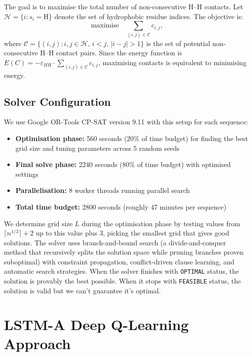 \documentclass[12pt, oneside, openany]{book}
\theoremstyle{plain}
\theoremstyle{definition}
\begin{document}
The goal is to maximise the total number of non-consecutive H--H contacts. Let $\mathcal{H} = \{i : s_i = \text{H}\}$ denote the set of hydrophobic residue indices. The objective is:
\begin{equation}
\text{maximise} \quad \sum_{(i,j) \in \mathcal{C}} c_{i,j},
\end{equation}
where $\mathcal{C} = \{(i,j) : i,j \in \mathcal{H}, \, i < j, \, |i - j| > 1\}$ is the set of potential non-consecutive H--H contact pairs. Since the energy function is $E(C) = -\varepsilon_{HH} \cdot \sum_{(i,j) \in \mathcal{C}} c_{i,j}$, maximising contacts is equivalent to minimising energy.

\subsection{Solver Configuration}

We use Google OR-Tools CP-SAT version 9.11 with this setup for each sequence:
\begin{itemize}
\item \textbf{Optimisation phase:} 560 seconds (20\% of time budget) for finding the best grid size and tuning parameters across 5 random seeds
\item \textbf{Final solve phase:} 2240 seconds (80\% of time budget) with optimised settings
\item \textbf{Parallelisation:} 8 worker threads running parallel search
\item \textbf{Total time budget:} 2800 seconds (roughly 47 minutes per sequence)
\end{itemize}
We determine grid size $L$ during the optimisation phase by testing values from $\lceil n^{1/3} \rceil + 2$ up to this value plus 3, picking the smallest grid that gives good solutions. The solver uses branch-and-bound search (a divide-and-conquer method that recursively splits the solution space while pruning branches proven suboptimal) with constraint propagation, conflict-driven clause learning, and automatic search strategies. When the solver finishes with \texttt{OPTIMAL} status, the solution is provably the best possible. When it stops with \texttt{FEASIBLE} status, the solution is valid but we can't guarantee it's optimal.
\newpage{}

\section{LSTM-A Deep Q-Learning Approach}
\label{sec:lstma_approach}
\end{document}
